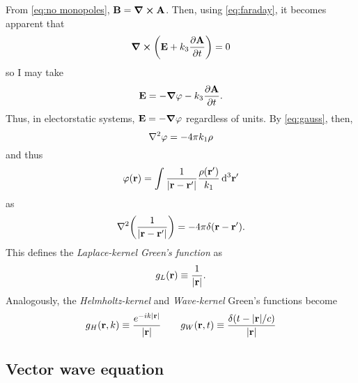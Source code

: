 From \cref{eq:no monopoles}, $\vb{B} = \curl{\vb{A}}$. 
Then, using \cref{eq:faraday}, it becomes apparent that
\begin{equation*}
  \curl{\qty(\vb{E} + k_3 \pdv{\vb{A}}{t})} = 0
\end{equation*}
so I may take
\begin{equation*}
  \vb{E} = -\grad{\varphi} - k_3 \pdv{\vb{A}}{t}.
\end{equation*}
Thus, in electorstatic systems, $\vb{E} = -\grad{\varphi}$ regardless of units.
By \cref{eq:gauss}, then,
\begin{equation*}
  \laplacian \varphi = -4 \pi k_1 \rho
\end{equation*}
and thus
\begin{equation*}
  \varphi(\vb{r}) = \int \frac{1}{\abs{\vb{r} - \vb{r}'}} \frac{\rho(\vb{r}')}{k_1} \dd[3]{\vb{r}'}
\end{equation*}
as
\begin{equation*}
  \laplacian \qty(\frac{1}{\abs{\vb{r} - \vb{r}'}}) = -4 \pi \delta(\vb{r} - \vb{r}').
\end{equation*}
This defines the \emph{Laplace-kernel Green's function} as
\begin{equation}
  g_L(\vb{r}) \equiv \frac{1}{\abs{\vb{r}}}.
  \label{eq:scalar green}
\end{equation}
Analogously, the \emph{Helmholtz-kernel} and \emph{Wave-kernel} Green's functions become
\begin{equation}
  g_H(\vb{r}, k) \equiv \frac{e^{-i k \abs{\vb{r}}}}{\abs{\vb{r}}} \qquad
  g_W(\vb{r}, t) \equiv \frac{\delta(t - \abs{\vb{r}}/c)}{\abs{\vb{r}}}
\end{equation}

\subsection{Vector wave equation}

